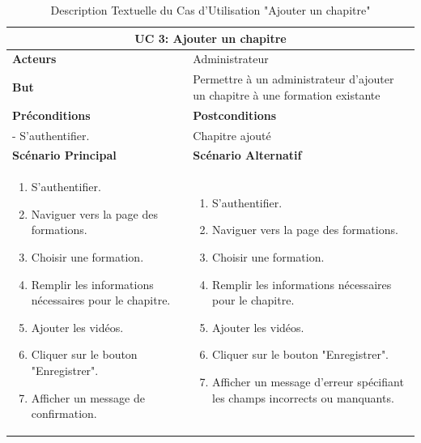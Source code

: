 \newpage

\begin{minipage}{\textwidth}
\begin{table}[H]
\centering
\begin{tabular}{| m{8cm} | m{8cm} |}
\hline
\multicolumn{2}{|c|}{\textbf{UC 3:} Ajouter un chapitre} \\ \hline
\textbf{Acteurs} & Administrateur \\ \hline
\textbf{But} & Permettre à un administrateur d'ajouter un chapitre à une formation existante \\ \hline
\textbf{Préconditions} & \textbf{Postconditions} \\ \hline
- S'authentifier. & Chapitre ajouté \\ \hline
\textbf{Scénario Principal} & \textbf{Scénario Alternatif} \\ \hline
\begin{enumerate}
    \item S'authentifier.
    \item Naviguer vers la page des formations.
    \item Choisir une formation.
    \item Remplir les informations nécessaires pour le chapitre.
    \item Ajouter les vidéos.
    \item Cliquer sur le bouton "Enregistrer".
    \item Afficher un message de confirmation.
\end{enumerate} & 
\begin{enumerate}
    \item S'authentifier.
    \item Naviguer vers la page des formations.
    \item Choisir une formation.
    \item Remplir les informations nécessaires pour le chapitre.
    \item Ajouter les vidéos.
    \item Cliquer sur le bouton "Enregistrer".
    \item Afficher un message d'erreur spécifiant les champs incorrects ou manquants.
\end{enumerate} \\ \hline
\end{tabular}
\caption{Description Textuelle du Cas d'Utilisation "Ajouter un chapitre"}
\label{tab:use_case_description_3}
\end{table}
\end{minipage}


